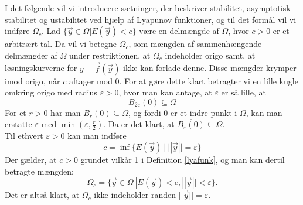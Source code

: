   I det følgende vil vi introducere sætninger, der beskriver stabilitet, asymptotisk stabilitet og ustabilitet ved hjælp af Lyapunov funktioner, og til det formål vil vi indføre $\Omega_c$. Lad $\{\vec{y}\in \Omega | E(\vec{y})<c\}$ være en delmængde af $\Omega$, hvor $c>0$ er et arbitrært tal. Da vil vi betegne $\Omega_c$, som mængden af sammenhængende delmængder af $\Omega$ under restriktionen, at $\Omega_c$ indeholder origo samt, at løsningskurverne for $\dot{y}=\vec{f}(\vec{y})$ ikke kan forlade denne.  
  Disse mængder krymper imod origo, når $c$ aftager mod $0$. For at gøre dette klart betragter vi en lille kugle omkring origo med radius $\varepsilon>0$, hvor man kan antage, at $\varepsilon$ er så lille, at
  \begin{equation}
      B_{2\varepsilon}(0)\subseteq \Omega
  \end{equation}
  For et $r>0$ har man $B_r(0)\subseteq\Omega$, og fordi $0$ er et indre punkt i $\Omega$, kan man erstatte $\varepsilon$ med $\min(\varepsilon,\frac{r}{2})$. Da er det klart, at  $\overline{B_\varepsilon(0)}\subseteq\Omega$.\\
  \hfill \break
    Til ethvert $\varepsilon > 0$ kan man indføre 
  \begin{equation}
    c=\inf\{E(\vec{y}) \ | \ ||\vec{y}||=\varepsilon \} 
  \end{equation}
  Der gælder, at $c>0$ grundet vilkår 1 i Definition \ref{lyafunk}, og man kan dertil betragte mængden:
  \begin{equation}
      \Omega_c=\{ \vec{y}\in \Omega \ | E(\vec{y})<c, ||\vec{y}||<\varepsilon\}.
  \end{equation}
  Det er altså klart, at $\Omega_c$ ikke indeholder randen $||\vec{y}||=\varepsilon$. 




